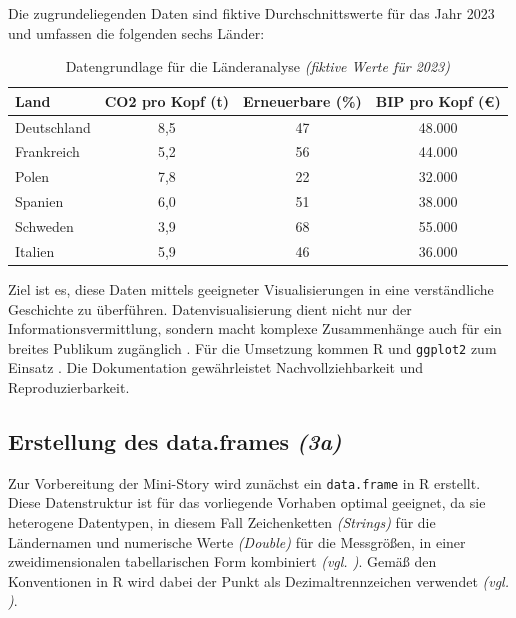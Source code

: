 Die zugrundeliegenden Daten sind fiktive Durchschnittswerte für das Jahr 2023 und umfassen die folgenden sechs Länder:

\begin{table}[H]
    \centering
    \begin{tabular}{l c c c}
        \toprule
        \textbf{Land} & \textbf{\acs{CO2} pro Kopf (t)} & \textbf{Erneuerbare (\%)} & \textbf{BIP pro Kopf (€)} \\
        \midrule
        Deutschland  & 8,5 & 47 & 48.000 \\
        Frankreich   & 5,2 & 56 & 44.000 \\
        Polen        & 7,8 & 22 & 32.000 \\
        Spanien      & 6,0 & 51 & 38.000 \\
        Schweden     & 3,9 & 68 & 55.000 \\
        Italien      & 5,9 & 46 & 36.000 \\
        \bottomrule
    \end{tabular}
    \caption{Datengrundlage für die Länderanalyse \textit{(fiktive Werte für 2023)}}
    \label{tab:co2-daten}
\end{table}

Ziel ist es, diese Daten mittels geeigneter Visualisierungen in eine verständliche Geschichte zu überführen. Datenvisualisierung dient nicht nur der Informationsvermittlung, sondern macht komplexe Zusammenhänge auch für ein breites Publikum zugänglich \cite[1]{2}. Für die Umsetzung kommen R und \texttt{ggplot2} zum Einsatz \cite[33]{3}. Die Dokumentation gewährleistet Nachvollziehbarkeit und Reproduzierbarkeit.


\subsection{Erstellung des data.frames \textit{(3a)}}
\label{sec:3a}

Zur Vorbereitung der Mini-Story wird zunächst ein \texttt{data.frame} in R erstellt. Diese Datenstruktur ist für das vorliegende Vorhaben optimal geeignet, da sie heterogene Datentypen, in diesem Fall Zeichenketten \textit{(Strings)} für die Ländernamen und numerische Werte \textit{(Double)} für die Messgrößen, in einer zweidimensionalen tabellarischen Form kombiniert \textit{(\acs{vgl.} \cite[14, 15]{3})}. Gemäß den Konventionen in R wird dabei der Punkt als Dezimaltrennzeichen verwendet \textit{(\acs{vgl.} \cite[46]{3})}.

